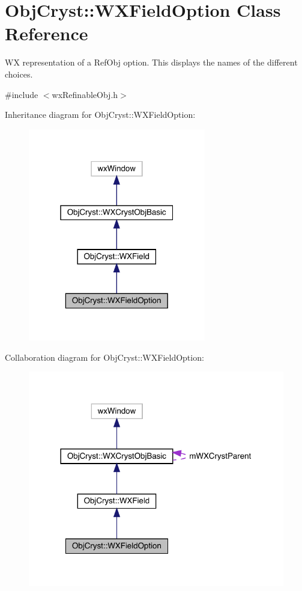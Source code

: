 \hypertarget{class_obj_cryst_1_1_w_x_field_option}{}\section{Obj\+Cryst\+::W\+X\+Field\+Option Class Reference}
\label{class_obj_cryst_1_1_w_x_field_option}


WX representation of a Ref\+Obj option. This displays the names of the different choices.  




{\ttfamily \#include $<$wx\+Refinable\+Obj.\+h$>$}



Inheritance diagram for Obj\+Cryst\+::W\+X\+Field\+Option\+:
\nopagebreak
\begin{figure}[H]
\begin{center}
\leavevmode
\includegraphics[width=220pt]{class_obj_cryst_1_1_w_x_field_option__inherit__graph}
\end{center}
\end{figure}


Collaboration diagram for Obj\+Cryst\+::W\+X\+Field\+Option\+:
\nopagebreak
\begin{figure}[H]
\begin{center}
\leavevmode
\includegraphics[width=318pt]{class_obj_cryst_1_1_w_x_field_option__coll__graph}
\end{center}
\end{figure}
